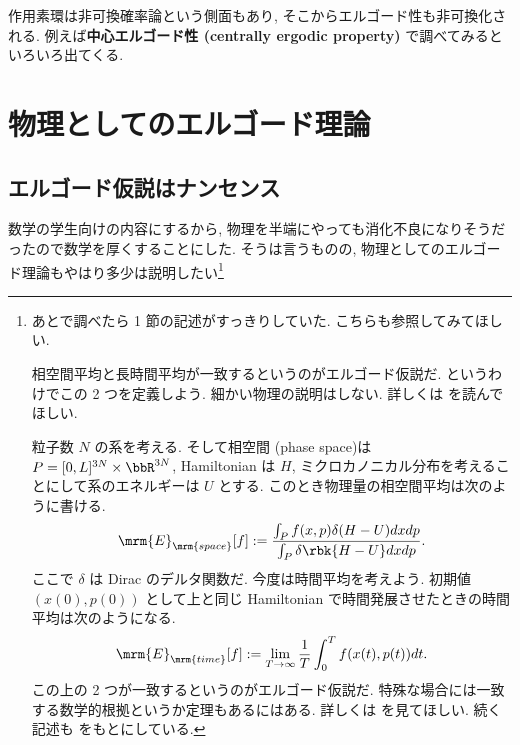 \documentclass[openany, a4paper, oneside]{jsbook}
\begin{document}
作用素環は非可換確率論という側面もあり, そこからエルゴード性も非可換化される.
例えば\textbf{中心エルゴード性 (centrally ergodic property)} で調べてみるといろいろ出てくる.
\section{物理としてのエルゴード理論}

\subsection{エルゴード仮説はナンセンス}

数学の学生向けの内容にするから,
物理を半端にやっても消化不良になりそうだったので数学を厚くすることにした.
そうは言うものの, 物理としてのエルゴード理論もやはり多少は説明したい\footnote{あとで調べたら \cite{AyumuSugita1} 1 節の記述がすっきりしていた.
こちらも参照してみてほしい.

相空間平均と長時間平均が一致するというのがエルゴード仮説だ.
というわけでこの 2 つを定義しよう.
細かい物理の説明はしない.
詳しくは \cite{NakamuraYamamoto1, NakamuraYamamoto2} を読んでほしい.

粒子数 $N$ の系を考える.
そして相空間 (phase space)\footnotemark は $P = [0, L]^{3N} \times \bbR^{3N}$,
Hamiltonian は $H$, ミクロカノニカル分布を考えることにして系のエネルギーは $U$ とする.
このとき物理量の相空間平均は次のように書ける.
\begin{align}
 \mrm{E}_{\mrm{space}} [f]
 :=
 \frac{\int_{P} f(x, p) \delta (H - U) dx dp} {\int_{P} \delta \rbk{H - U} dx dp}.
\end{align}
ここで $\delta$ は Dirac のデルタ関数だ.
今度は時間平均を考えよう.
初期値 $(x(0), p(0))$ として上と同じ Hamiltonian で時間発展させたときの時間平均は次のようになる.
\begin{align}
 \mrm{E}_{\mrm{time}} [f]
 :=
 \lim_{T \to \infty} \frac{1}{T} \int_0^T f(x(t), p(t)) dt.
\end{align}
この上の 2 つが一致するというのがエルゴード仮説だ.
特殊な場合には一致する数学的根拠というか定理もあるにはある.
詳しくは \cite{HalTasaki3} を見てほしい.
続く記述も \cite{HalTasaki3} をもとにしている.}
\end{document}
